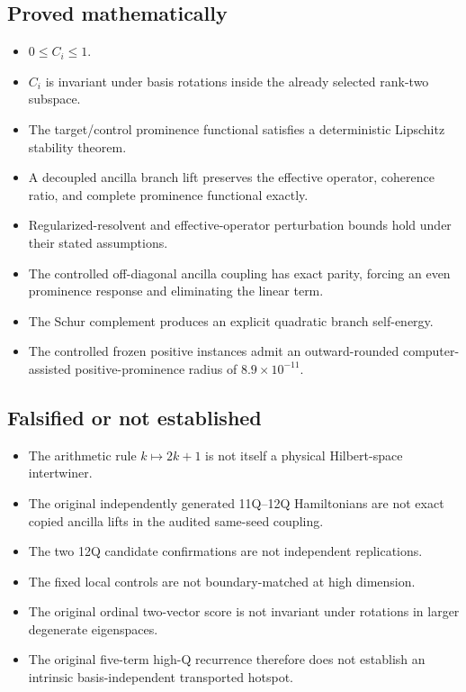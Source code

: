 \documentclass[11pt,a4paper]{article}
\begin{document}
\subsection{Proved mathematically}

\begin{itemize}
\item \(0\le C_i\le1\).
\item \(C_i\) is invariant under basis rotations inside the already selected
      rank-two subspace.
\item The target/control prominence functional satisfies a deterministic
      Lipschitz stability theorem.
\item A decoupled ancilla branch lift preserves the effective operator,
      coherence ratio, and complete prominence functional exactly.
\item Regularized-resolvent and effective-operator perturbation bounds hold
      under their stated assumptions.
\item The controlled off-diagonal ancilla coupling has exact parity, forcing
      an even prominence response and eliminating the linear term.
\item The Schur complement produces an explicit quadratic branch self-energy.
\item The controlled frozen positive instances admit an outward-rounded
      computer-assisted positive-prominence radius of
      \(8.9\times10^{-11}\).
\end{itemize}

\subsection{Falsified or not established}

\begin{itemize}
\item The arithmetic rule \(k\mapsto2k+1\) is not itself a physical
      Hilbert-space intertwiner.
\item The original independently generated 11Q--12Q Hamiltonians are not
      exact copied ancilla lifts in the audited same-seed coupling.
\item The two 12Q candidate confirmations are not independent replications.
\item The fixed local controls are not boundary-matched at high dimension.
\item The original ordinal two-vector score is not invariant under rotations
      in larger degenerate eigenspaces.
\item The original five-term high-Q recurrence therefore does not establish
      an intrinsic basis-independent transported hotspot.
\end{itemize}
\end{document}
